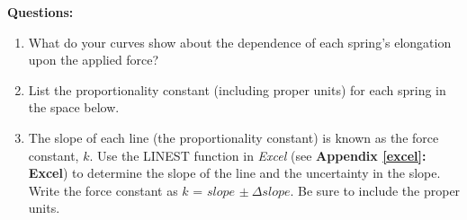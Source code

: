 \pagebreak

\textbf{Questions:}

\begin{enumerate}
\item What do your curves show about the dependence of each spring's elongation upon the applied force?\vspace{30mm}

\item List the proportionality constant (including proper units) for each spring in the space below.\vspace{30mm}

\item The slope of each line (the proportionality constant) is known as the 
force constant, $k$. Use the LINEST function in \textit{Excel} (see \textbf{Appendix \ref{excel}:
 Excel}) to determine the slope of the line and the uncertainty in the slope. 
Write the force constant as $k$ = $slope$ \( \pm \ \Delta  slope\).  Be sure to 
include the proper units.
\end{enumerate}
